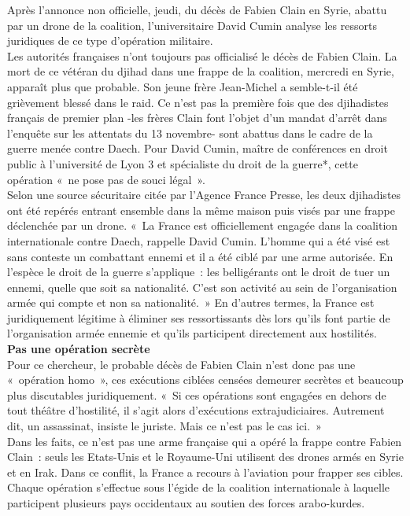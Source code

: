 \documentclass[8pt]{article}
\begin{document}
Après l’annonce non officielle, jeudi, du décès de Fabien Clain en Syrie, abattu par un drone de la coalition, l’universitaire David Cumin analyse les ressorts juridiques de ce type d’opération militaire.\\

Les autorités françaises n’ont toujours pas officialisé le décès de Fabien Clain. La mort de ce vétéran du djihad dans une frappe de la coalition, mercredi en Syrie, apparaît plus que probable. Son jeune frère Jean-Michel a semble-t-il été grièvement blessé dans le raid. Ce n’est pas la première fois que des djihadistes français de premier plan -les frères Clain font l’objet d’un mandat d’arrêt dans l’enquête sur les attentats du 13 novembre- sont abattus dans le cadre de la guerre menée contre Daech. Pour David Cumin, maître de conférences en droit public à l’université de Lyon 3 et spécialiste du droit de la guerre*, cette opération «~ne pose pas de souci légal~».\\

Selon une source sécuritaire citée par l’Agence France Presse, les deux djihadistes ont été repérés entrant ensemble dans la même maison puis visés par une frappe déclenchée par un drone. «~La France est officiellement engagée dans la coalition internationale contre Daech, rappelle David Cumin. L’homme qui a été visé est sans conteste un combattant ennemi et il a été ciblé par une arme autorisée. En l’espèce le droit de la guerre s’applique~: les belligérants ont le droit de tuer un ennemi, quelle que soit sa nationalité. C’est son activité au sein de l’organisation armée qui compte et non sa nationalité.~» En d’autres termes, la France est juridiquement légitime à éliminer ses ressortissants dès lors qu’ils font partie de l’organisation armée ennemie et qu’ils participent directement aux hostilités.\\


\textbf{Pas une opération secrète}\\

Pour ce chercheur, le probable décès de Fabien Clain n’est donc pas une «~opération homo~», ces exécutions ciblées censées demeurer secrètes et beaucoup plus discutables juridiquement. «~Si ces opérations sont engagées en dehors de tout théâtre d’hostilité, il s’agit alors d’exécutions extrajudiciaires. Autrement dit, un assassinat, insiste le juriste. Mais ce n’est pas le cas ici.~»\\

Dans les faits, ce n’est pas une arme française qui a opéré la frappe contre Fabien Clain~: seuls les Etats-Unis et le Royaume-Uni utilisent des drones armés en Syrie et en Irak. Dans ce conflit, la France a recours à l’aviation pour frapper ses cibles. Chaque opération s’effectue sous l’égide de la coalition internationale à laquelle participent plusieurs pays occidentaux au soutien des forces arabo-kurdes.\\
\end{document}
